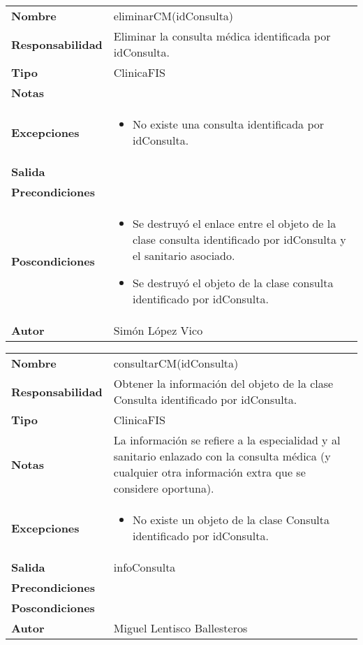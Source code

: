 \documentclass[11pt,a4paper]{article}
\newenvironment{itemizenomargins}
    {\begin{minipage}[t]{1\linewidth}\begin{itemize}}
    {\end{itemize}\end{minipage}}
\begin{document}
\begin{table}[H]
	\centering
	\label{my-label}
	\begin{tabularx}{\textwidth}{l|X}
		\textbf{Nombre}          & eliminarCM(idConsulta)\\
		\textbf{Responsabilidad} & Eliminar la consulta médica identificada por idConsulta. \\
		\textbf{Tipo}            & ClinicaFIS \\
		\textbf{Notas}           &  \\
		\textbf{Excepciones}     &
		\begin{itemizenomargins}
			\item No existe una consulta identificada por idConsulta.
		\end{itemizenomargins} \\
		\textbf{Salida}          &  \\
		\textbf{Precondiciones}  &  \\
		\textbf{Poscondiciones}  & 
		\begin{itemizenomargins}
			\item Se destruyó el enlace entre el objeto de la clase consulta identificado por idConsulta y el sanitario asociado.
			\item Se destruyó el objeto de la clase consulta identificado por idConsulta.
		\end{itemizenomargins} \\
		\textbf{Autor}			 & Simón López Vico
	\end{tabularx}
\end{table}

\begin{table}[H]
	\centering
	\label{my-label}
	\begin{tabularx}{\textwidth}{l|X}
		\textbf{Nombre}          & consultarCM(idConsulta)\\
		\textbf{Responsabilidad} & Obtener la información del objeto de la clase Consulta identificado por idConsulta. \\
		\textbf{Tipo}            & ClinicaFIS \\
		\textbf{Notas}           & La información se refiere a la especialidad y al sanitario enlazado con la consulta médica (y cualquier otra información extra que se considere oportuna). \\
		\textbf{Excepciones}     &  
			\begin{itemizenomargins}
				\item No existe un objeto de la clase Consulta identificado por idConsulta.
			\end{itemizenomargins}		\\
		\textbf{Salida}          &  infoConsulta \\
		\textbf{Precondiciones}  &  \\
		\textbf{Poscondiciones}  &  \\
		\textbf{Autor}			 & Miguel Lentisco Ballesteros
	\end{tabularx}
\end{table}
\end{document}
